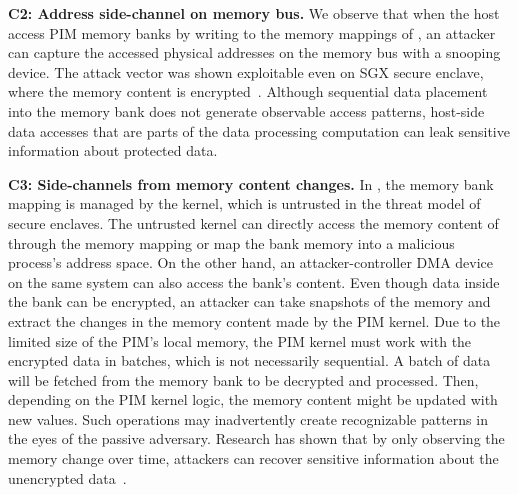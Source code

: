
\textbf{C2: Address side-channel on memory bus.} \label{c2}
We observe that when the host access PIM memory banks by writing to the memory mappings of \baseline, an attacker can capture the accessed physical addresses on the memory bus with a snooping device. The attack vector was shown exploitable even on SGX secure enclave, where the memory content is encrypted~\cite{membuster}. Although sequential data placement into the memory bank does not generate observable access patterns, host-side data accesses that are parts of the data processing computation can leak sensitive information about protected data. 

\textbf{C3: Side-channels from memory content changes.} \label{c3}
In \baseline, the memory bank mapping is managed by the kernel, which is untrusted in the threat model of secure enclaves. The untrusted kernel can directly access the memory content of \baseline through the memory mapping or map the bank memory into a malicious process's address space. On the other hand, an attacker-controller DMA device on the same system can also access the bank's content. Even though data inside the bank can be encrypted, an attacker can take snapshots of the memory and extract the changes in the memory content made by the PIM kernel. Due to the limited size of the PIM’s local memory, the PIM kernel must work with the encrypted data in batches, which is not necessarily sequential. A batch of data will be fetched from the memory bank to be decrypted and processed. Then, depending on the PIM kernel logic, the memory content might be updated with new values. Such operations may inadvertently create recognizable patterns in the eyes of the passive adversary. Research has shown that by only observing the memory change over time, attackers can recover sensitive information about the unencrypted data~\cite{write-access-pattern}. %


